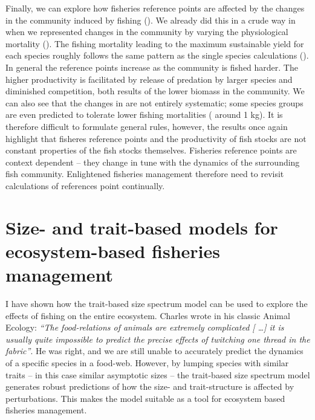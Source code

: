 Finally, we can explore how fisheries reference points are affected by the changes in the community induced by fishing ().  We already did this in a crude way in  when we represented changes in the community by varying the physiological mortality ().  The fishing mortality leading to the maximum sustainable yield {\Fmsy} for each species roughly follows the same pattern as the single species calculations ().  In general the reference points increase as the community is fished harder.  The higher productivity is facilitated by release of predation by larger species and diminished competition, both results of the lower biomass in the community.  We can also see that the changes in {\Fmsy} are not entirely systematic; some species groups are even predicted to tolerate lower fishing mortalities ({\W} around 1 kg).  It is therefore difficult to formulate general rules, however, the results once again highlight that fisheres reference points and the productivity of fish stocks are not constant properties of the fish stocks themselves. Fisheries reference points are context dependent -- they change in tune with the dynamics of the surrounding fish community.  Enlightened fisheries management therefore need to revisit calculations of references point continually.



\section{Size- and trait-based models for ecosystem-based fisheries management}
I have shown how the trait-based size spectrum model can be used to explore the effects of fishing on the entire ecosystem.  Charles \citet{Elton1926} wrote in his classic Animal Ecology: \emph{``The food-relations of animals are extremely complicated [ \ldots ] it is usually quite impossible to predict the precise effects of twitching one thread in the fabric''}.  He was right, and we are still unable to accurately predict the dynamics of a specific species in a food-web.  However, by lumping species with similar traits -- in this case similar asymptotic sizes -- the trait-based size spectrum model generates robust predictions of how the size- and trait-structure is affected by perturbations.  This makes the model suitable as a tool for ecosystem based fisheries management.

